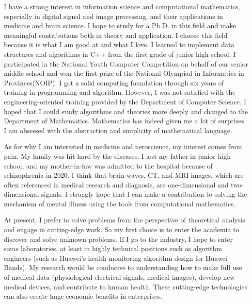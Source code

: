 \documentclass{article}
\numberwithin{equation}{section}
\begin{document}
I have a strong interest in information science and computational mathematics, especially in digital signal and image processing, and their applications in medicine and brain science. I hope to study for a Ph.D. in this field and make meaningful contributions both in theory and application. I choose this field because it is what I am good at and what I love. I learned to implement data structures and algorithms in C++ from the first grade of junior high school. I participated in the National Youth Computer Competition on behalf of our senior middle school and won the first prize of the National Olympiad in Informatics in Provinces(NOIP). I got a solid computing foundation through six years of training in programming and algorithm. However, I was not satisfied with the engineering-oriented training provided by the Department of Computer Science. I hoped that I could study algorithms and theories more deeply and changed to the Department of Mathematics. Mathematics has indeed given me a lot of surprises. I am obsessed with the abstraction and simplicity of mathematical language.

As for why I am interested in medicine and neroscience, my interest comes from pain. My
family was hit hard by the diseases. I lost my father in junior high school, and my mother-in-law was admitted to the hospital because of schizophrenia in 2020. I think that brain waves, CT, and MRI images, which are often referenced in medical research and diagnosis, are one-dimensional and two-dimensional signals. I strongly hope that I can make a contribution to solving the mechanism of mental illness using the tools from computational mathematics.

At present, I prefer to solve problems from the perspective of theoretical analysis and engage in cutting-edge work. So my first choice is to enter the academia to discover and solve unknown problems. If I go to the industry, I hope to enter some laboratories, at least in highly technical positions such as algorithm engineers (such as Huawei's health monitoring algorithm design for Huawei Bands). My research would be conducive to understanding how to make full use of medical data (physiological electrical signals, medical images), develop new medical devices, and contribute to human health. These cutting-edge technologies can also create huge economic benefits in enterprises.
\end{document}
